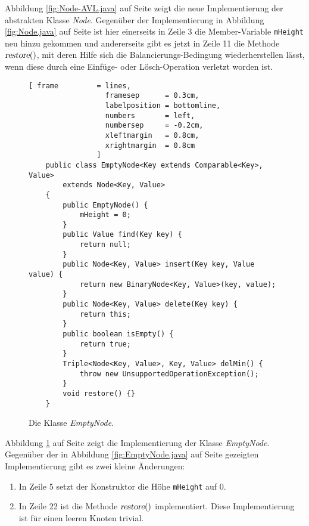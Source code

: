 Abbildung \ref{fig:Node-AVL.java} auf Seite \pageref{fig:Node-AVL.java} zeigt die neue
Implementierung der abstrakten Klasse \textsl{Node}.  Gegen\"uber der Implementierung in Abbildung
\ref{fig:Node.java} auf Seite \pageref{fig:Node.java} ist hier einerseits in Zeile 3 die
Member-Variable \texttt{mHeight} neu hinzu gekommen und andererseits gibt es jetzt in
Zeile 11 die Methode $\textsl{restore}()$, mit deren Hilfe sich die
Balancierungs-Bedingung wiederherstellen l\"asst, wenn diese durch eine Einf\"uge- oder
L\"osch-Operation verletzt worden ist.


\begin{figure}[!ht]
  \centering
\begin{Verbatim}[ frame         = lines, 
                  framesep      = 0.3cm, 
                  labelposition = bottomline,
                  numbers       = left,
                  numbersep     = -0.2cm,
                  xleftmargin   = 0.8cm,
                  xrightmargin  = 0.8cm
                ]
    public class EmptyNode<Key extends Comparable<Key>, Value> 
        extends Node<Key, Value>
    {
        public EmptyNode() {
            mHeight = 0;
        }       
        public Value find(Key key) { 
            return null; 
        }
        public Node<Key, Value> insert(Key key, Value value) {
            return new BinaryNode<Key, Value>(key, value);
        }       
        public Node<Key, Value> delete(Key key) {
            return this;
        }    
        public boolean isEmpty() {
            return true;
        }
        Triple<Node<Key, Value>, Key, Value> delMin() {
            throw new UnsupportedOperationException();
        }
        void restore() {}
    }
\end{Verbatim}
\vspace*{-0.3cm}
  \caption{Die Klasse \textsl{EmptyNode}.}
  \label{fig:EmptyNode-AVL.java}
\end{figure}

Abbildung \ref{fig:EmptyNode-AVL.java} auf Seite \pageref{fig:EmptyNode-AVL.java}
zeigt die Implementierung der Klasse \textsl{EmptyNode}.  Gegen\"uber der in
Abbildung \ref{fig:EmptyNode.java} auf Seite \pageref{fig:EmptyNode.java} gezeigten
Implementierung gibt es zwei kleine Änderungen:
\begin{enumerate}
\item In Zeile 5 setzt der Konstruktor die H\"ohe \texttt{mHeight} auf 0.
\item In Zeile 22 ist die Methode $\textsl{restore}()$ implementiert.  Diese
      Implementierung ist f\"ur einen leeren Knoten trivial.
\end{enumerate}

